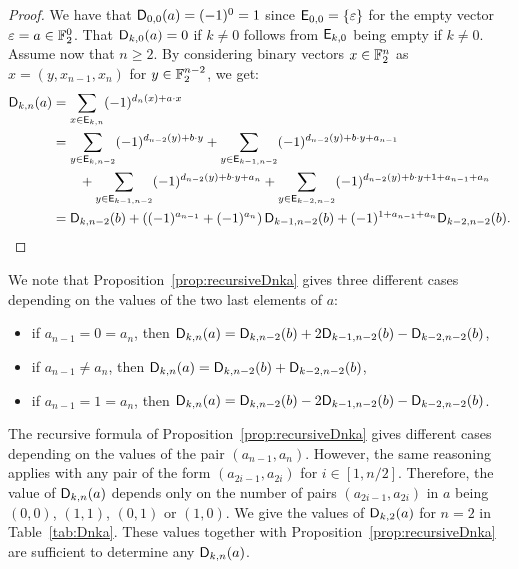 \documentclass[11pt]{llncs}
\begin{document}
\begin{proof}
    We have that $\Dnka 00a=(-1)^0=1$ since $\Ekn 00=\{\varepsilon\}$ for the empty vector $\varepsilon=a\in\F_2^0$. That $\Dnka 0ka=0$ if $k\neq 0$ follows from $\Ekn k0$ being empty if $k\neq 0$. Assume now that $n\geq 2$. By considering binary vectors $x\in\F_2^n$ as $x=(y,x_{n-1},x_n)$ for $y\in\F_2^{n-2}$, we get:
    \begin{align*}
		\Dnka{n}{k}{a}&=\sum_{x\in \Ekn{k}{n}} (-1)^{d_n(x) +a\cdot x}\\
		&=\sum_{y\in \Ekn{k}{n-2}} (-1)^{d_{n-2}(y) +b\cdot y}+
		\sum_{y\in \Ekn{k-1}{n-2}} (-1)^{d_{n-2}(y) +b\cdot y + a_{n-1}}\\
		&\qquad+\sum_{y\in \Ekn{k-1}{n-2}} (-1)^{d_{n-2}(y) +b\cdot y + a_{n}}
		+\sum_{y\in \Ekn{k-2}{n-2}} (-1)^{d_{n-2}(y) +b\cdot y +1 + a_{n-1}+ a_{n}}\\
		&=\Dnka{n-2}{k}{b}+\left((-1)^{a_{n-1}} + (-1)^{a_{n}}\right)\Dnka{n-2}{k-1}{b} + (-1)^{1+a_{n-1}+a_n} \Dnka{n-2}{k-2}{b}.\qedhere
    \end{align*}
\end{proof}

\begin{remark}
    We note that Proposition~\ref{prop:recursiveDnka} gives three different cases depending on the values of the two last elements of $a$:%
	\begin{itemize}
		\item if $a_{n-1}=0=a_n$, then $\Dnka{n}{k}{a}=\Dnka{n-2}{k}{b}+2\Dnka{n-2}{k-1}{b}-\Dnka{n-2}{k-2}{b}$,
		\item if $a_{n-1} \ne a_n$, then $\Dnka{n}{k}{a}=\Dnka{n-2}{k}{b}+\Dnka{n-2}{k-2}{b}$,
		\item if $a_{n-1}=1=a_n$, then $\Dnka{n}{k}{a}=\Dnka{n-2}{k}{b}-2\Dnka{n-2}{k-1}{b}-\Dnka{n-2}{k-2}{b}$.
	\end{itemize}
\end{remark}

\begin{remark}\label{rmk:dependence_dnka}
    The recursive formula of Proposition~\ref{prop:recursiveDnka} gives different cases depending on the values of the pair $(a_{n-1},a_n)$. However, the same reasoning applies with any pair of the form $(a_{2i-1}, a_{2i})$ for $i\in[1,n/2]$. Therefore, the value of $\Dnka{n}{k}{a}$ depends only on the number of pairs $(a_{2i-1}, a_{2i})$ in $a$ being $(0,0)$, $(1,1)$, $(0,1)$ or $(1,0)$. We give the values of $\Dnka{2}{k}{a}$ for $n=2$ in Table~\ref{tab:Dnka}. These values together with Proposition~\ref{prop:recursiveDnka} are sufficient to determine any $\Dnka{n}{k}{a}$.
\end{remark}
\end{document}
